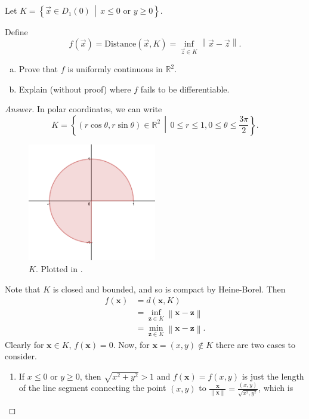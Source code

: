 \documentclass[12pt]{article}
\newcommand{\real}{\mathbb{R}}
\newcommand\paren[1]{\left( #1 \right)}
\newcommand\setb[1]{\left \{ #1 \right \}}
\newcommand{\norm}[1]{\left\| #1 \right\|}
\theoremstyle{definition}
\begin{document}
Let $K = \setb{ \vec{x} \in D_1(0) \, \middle| \, x \leq 0 \text{ or } y \geq 0 }$.

Define 
\[
    f \paren{ \vec{x} } = \mathrm{Distance} \paren{ \vec{x} , K } = \inf\limits_{ \vec{z} \in K } \norm{ \vec{x} - \vec{z} }.
\]
\begin{enumerate}[a)]
    \item Prove that $f$ is uniformly continuous in $\real^2$.
    \item Explain (without proof) where $f$ fails to be differentiable.
\end{enumerate}
\begin{proof}[Answer]
    In polar coordinates, we can write
    \[
        K = \setb{ \paren{r \cos \theta , r \sin \theta } \in \real^2 \, \middle| \, 0 \leq r \leq 1 , 0 \leq \theta \leq \frac{3\pi}{2} }.
    \]
    \begin{figure}[H]
        \centering
        \includegraphics[width = 0.5\textwidth]{1.png}
        \caption{$K$. Plotted in \cite{Desmos}.}
        \label{fig:fig1}
    \end{figure}
    Note that $K$ is closed and bounded, and so is compact by Heine-Borel. Then 
    \begin{align*}
        f \paren{ \mathbf{x} } & = d \paren{ \mathbf{x} , K } \\
        & = \inf\limits_{ \mathbf{z} \in K } \norm{ \mathbf{x} - \mathbf{z} } \\
        & = \min\limits_{ \mathbf{z} \in K } \norm{ \mathbf{x} - \mathbf{z} }.
    \end{align*}
    Clearly for $\mathbf{x} \in K$, $f \paren{ \mathbf{x} } = 0$. Now, for $\mathbf{x} = (x,y) \notin K$ there are two cases to consider. 
    \begin{enumerate}
        \item If $x \leq 0$ or $y \geq 0$, then $\sqrt{x^2+y^2} > 1$ and $f \paren{ \mathbf{x} } = f(x,y)$ is just the length of the line segment connecting the point $(x,y)$ to $\frac{\mathbf{x}}{\norm{\mathbf{x}}} = \frac{(x,y)}{\sqrt{x^2,y^2}}$, which is 

\end{enumerate}
\end{proof}
\end{document}
